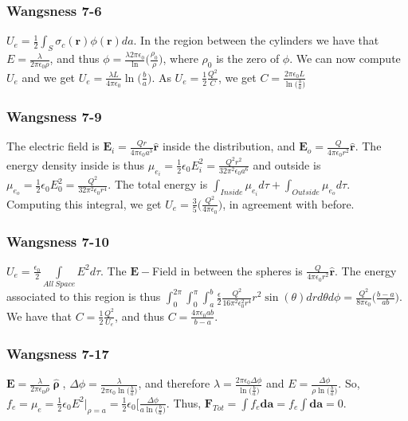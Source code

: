 \documentclass[crop=false,class=article,oneside]{standalone}
\begin{document}
        \subsubsection{Wangsness 7-6}
        $U_e = \frac{1}{2}\int_{S}\sigma_c(\mathbf{r})\phi(\mathbf{r})da$. In the region between the cylinders we have that $E = \frac{\lambda}{2\pi \epsilon_0 \rho}$, and thus $\phi= \frac{\lambda 2\pi \epsilon_0}\ln\big(\frac{\rho_0}{\rho}\big)$, where $\rho_0$ is the zero of $\phi$. We can now compute $U_e$ and we get $U_e = \frac{\lambda L}{4\pi \epsilon_0}\ln\big(\frac{b}{a}\big)$. As $U_e = \frac{1}{2}\frac{Q^2}{C}$, we get $C= \frac{2\pi \epsilon_0 L}{\ln\big(\frac{b}{a}\big)}$
        \subsubsection{Wangsness 7-9}
        The electric field is $\mathbf{E}_i = \frac{Qr}{4\pi \epsilon_0 a^3}\hat{\mathbf{r}}$ inside the distribution, and $\mathbf{E}_o = \frac{Q}{4\pi\epsilon_0r^2}\hat{\mathbf{r}}$. The energy density inside is thus $\mu_{e_i} = \frac{1}{2}\epsilon_0 E_i^2=\frac{Q^2r^2}{32\pi^2 \epsilon_0 a^6}$ and outside is $\mu_{e_o} = \frac{1}{2}\epsilon_0 E_0^2 = \frac{Q^2}{32\pi^2 \epsilon_0 r^4}$. The total energy is $\int_{Inside} \mu_{e_i}d\tau + \int_{Outside} \mu_{e_o}d\tau$. Computing this integral, we get $U_e = \frac{3}{5}\bigg( \frac{Q^2}{4\pi \epsilon_0}\bigg)$, in agreement with before.
        \subsubsection{Wangsness 7-10}
        $U_e = \frac{\epsilon_0}{2} \underset{All\ Space}\int E^2 d\tau$. The $\mathbf{E}-$Field in between the spheres is $\frac{Q}{4\pi \epsilon_0 r^2}\hat{\mathbf{r}}$. The energy associated to this region is thus $\int_{0}^{2\pi}\int_{0}^{\pi}\int_{a}^{b} \frac{\epsilon}{2} \frac{Q^2}{16\pi^2 \epsilon_0^2 r^4}r^2\sin(\theta) dr d\theta d\phi = \frac{Q^2}{8\pi \epsilon_0}\bigg(\frac{b-a}{ab}\bigg)$. We have that $C = \frac{1}{2} \frac{Q^2}{U_e}$, and thus $C = \frac{4\pi \epsilon_0 ab}{b-a}$.
        \subsubsection{Wangsness 7-17}
        $\mathbf{E} = \frac{\lambda}{2\pi \epsilon_0 \rho}\hat{\boldsymbol{\uprho}}$, $\Delta\phi = \frac{\lambda}{2\pi \epsilon_0 \ln\big(\frac{b}{a}\big)}$, and therefore $\lambda = \frac{2\pi \epsilon_0 \Delta\phi}{\ln\big(\frac{b}{a}\big)}$ and $E = \frac{\Delta \phi}{\rho \ln\big(\frac{b}{a}\big)}$. So, $f_e = \mu_e = \frac{1}{2} \epsilon_0 E^2\bigg|_{\rho = a} = \frac{1}{2} \epsilon_0 \bigg[ \frac{\Delta\phi}{a \ln\big(\frac{b}{a}\big)}$. Thus, $\mathbf{F}_{Tot} = \int f_e \mathbf{da} = f_e \int \mathbf{da} = 0$.
\end{document}
